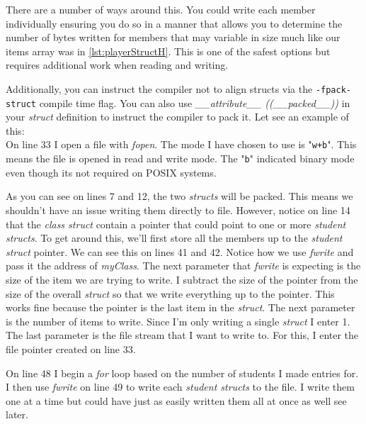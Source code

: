 \documentclass[../main.tex]{subfiles}
\begin{document}
	There are a number of ways around this.  You could write each member individually ensuring you do so in a manner that allows you to determine the number of bytes written for members that may variable in size much like our items array was in \ref{lst:playerStructH}.  This is one of the safest options but requires additional work when reading and writing.
	
	Additionally, you can instruct the compiler not to align structs via the \texttt{-fpack-struct} \cite{c_nutshell} compile time flag.   You can also use \textit{\_\_attribute\_\_ ((\_\_packed\_\_))} \cite{gnu_website} in your \textit{struct} definition to instruct the compiler to pack it.	Let see an example of this:\\
	
	
	
	On line 33 I open a file with \textit{fopen}.  The mode I have chosen to use is "\texttt{w+b}".  This means the file is opened in read and write mode.  The "\texttt{b}" indicated binary mode even though its not required on POSIX systems.
	
	As you can see on lines 7 and 12, the two \textit{structs} will be packed.  This means we shouldn't have an issue writing them directly to file.  However, notice on line 14 that the \textit{class struct} contain a pointer that could point to one or more \textit{student structs}.  To get around this, we'll first store all the members up to the \textit{student struct} pointer. We can see this on lines 41 and 42.  Notice how we use \textit{fwrite} and pass it the address of \textit{myClass}.  The next parameter that \textit{fwrite} is expecting is the size of the item we are trying to write.  I subtract the size of the pointer from the size of the overall \textit{struct} so that we write everything up to the pointer.  This works fine because the pointer is the last item in the \textit{struct}.  The next parameter is the number of items to write.  Since I'm only writing a single \textit{struct} I enter 1.  The last parameter is the file stream that I want to write to.  For this, I enter the file pointer created on line 33.
	
	On line 48 I begin a \textit{for} loop based on the number of students I made entries for.  I then use \textit{fwrite} on line 49 to write each \textit{student structs} to the file.  I write them one at a time but could have just as easily written them all at once as well see later.
	
\end{document}
